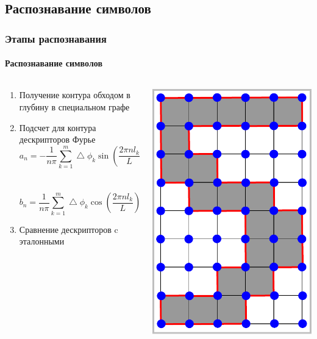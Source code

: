 \subsection{Распознавание символов}

\begin{frame}
  \frametitle{Этапы распознавания}
  \framesubtitle{Распознавание символов}

  \begin{columns}
    \begin{column}{0.62\textwidth}
   \begin{enumerate}
    \item Получение контура обходом в глубину в специальном графе
    \item Подсчет для контура дескрипторов Фурье
      \[
  a_n = -\frac{1}{n\pi}\sum_{k=1}^{m}\bigtriangleup\phi_k\sin(\frac{2\pi n l_k}{L}) \] \\~
\[  b_n = \frac{1}{n\pi}\sum_{k=1}^{m}\bigtriangleup\phi_k\cos(\frac{2\pi n l_k}{L})
\]
    \item Сравнение дескрипторов c эталонными
   \end{enumerate}
   \end{column}
   \begin{column}{0.4\textwidth}
\centering     \includegraphics[scale=0.4]{media/five.pdf}
   \end{column}
 \end{columns}
\end{frame}

